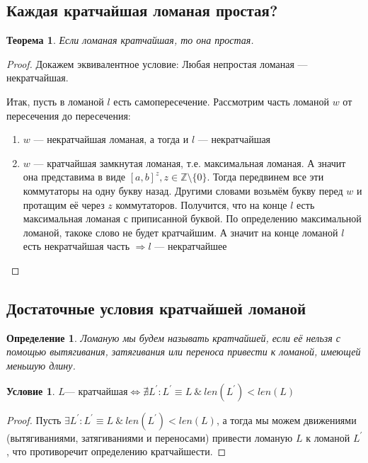 \documentclass[12pt,a4paper, flushleft]{article}
\newtheorem{Def}{Определение}[section]
\newtheorem{Th}{Теорема}[section]
\newtheorem{Con}{Условие}[section]
\newcommand{\p}[1]{#1^{\prime}}
\begin{document}
\subsection{Каждая кратчайшая ломаная простая?}

\begin{Th}
	Если ломаная кратчайшая, то она простая. 
\end{Th}
\begin{proof}
	Докажем эквивалентное условие: Любая непростая ломаная --- некратчайшая.
	
	Итак, пусть в ломаной $l$ есть самопересечение. Рассмотрим часть ломаной  $w$ от пересечения до пересечения:
	\begin{enumerate}
		\item $w$ --- некратчайшая ломаная, а тогда и $l$ --- некратчайшая
		\item $w$ --- кратчайшая замкнутая ломаная, т.е. максимальная ломаная. А значит она представима в виде $[a, b]^z, z\in \mathds{Z}\setminus \{0\}$. Тогда передвинем все эти коммутаторы на одну букву назад. Другими словами возьмём букву перед  $w$ и протащим её через $z$ коммутаторов. Получится, что на конце $l$ есть максимальная ломаная с приписанной буквой. По определению максимальной ломаной, такоке слово не будет кратчайшим. А значит на конце ломаной $l$ есть некратчайшая часть $\Rightarrow l$ --- некратчайшее
	\end{enumerate}
\end{proof}
\subsection{Достаточные условия кратчайшей ломаной}
\begin{Def}
Ломаную мы будем называть кратчайшей, если её нельзя с помощью вытягивания, затягивания
или переноса привести к ломаной, имеющей меньшую длину.
\end{Def}

\begin{Con}
	$L \text{--- кратчайшая}\Longleftrightarrow\nexists \p L: \p L\equiv L ~\&~ len(\p L)<len(L)$
\end{Con}
\begin{proof}
	Пусть $\exists \p L: \p L\equiv L ~\&~ len(\p L)<len(L)$, а тогда мы можем движениями (вытягиваниями, затягиваниями и переносами) привести ломаную $L$  к ломаной $\p L$, что противоречит определению кратчайшести.
\end{proof}	
\end{document}
